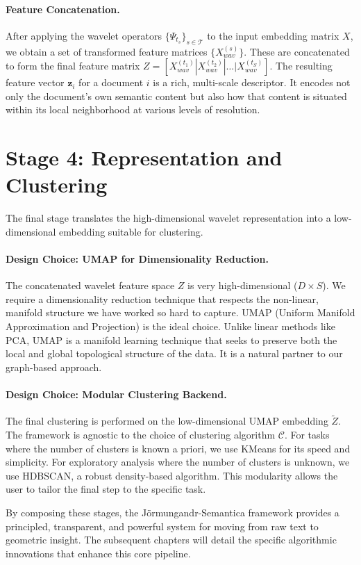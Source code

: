 \paragraph{Feature Concatenation.} After applying the wavelet operators $\{\Psi_{t_s}\}_{s \in \mathcal{T}}$ to the input embedding matrix $X$, we obtain a set of transformed feature matrices $\{X_{wav}^{(s)}\}$. These are concatenated to form the final feature matrix $Z = [X_{wav}^{(t_1)} | X_{wav}^{(t_2)} | \dots | X_{wav}^{(t_S)}]$. The resulting feature vector $\bm{z}_i$ for a document $i$ is a rich, multi-scale descriptor. It encodes not only the document's own semantic content but also how that content is situated within its local neighborhood at various levels of resolution.

\section{Stage 4: Representation and Clustering}
The final stage translates the high-dimensional wavelet representation into a low-dimensional embedding suitable for clustering.

\paragraph{Design Choice: UMAP for Dimensionality Reduction.} The concatenated wavelet feature space $Z$ is very high-dimensional ($D \times S$). We require a dimensionality reduction technique that respects the non-linear, manifold structure we have worked so hard to capture. UMAP (Uniform Manifold Approximation and Projection) \citep{mcinnes2018umap} is the ideal choice. Unlike linear methods like PCA, UMAP is a manifold learning technique that seeks to preserve both the local and global topological structure of the data. It is a natural partner to our graph-based approach.

\paragraph{Design Choice: Modular Clustering Backend.} The final clustering is performed on the low-dimensional UMAP embedding $\tilde{Z}$. The framework is agnostic to the choice of clustering algorithm $\mathcal{C}$. For tasks where the number of clusters is known a priori, we use KMeans for its speed and simplicity. For exploratory analysis where the number of clusters is unknown, we use HDBSCAN, a robust density-based algorithm. This modularity allows the user to tailor the final step to the specific task.

By composing these stages, the Jörmungandr-Semantica framework provides a principled, transparent, and powerful system for moving from raw text to geometric insight. The subsequent chapters will detail the specific algorithmic innovations that enhance this core pipeline.